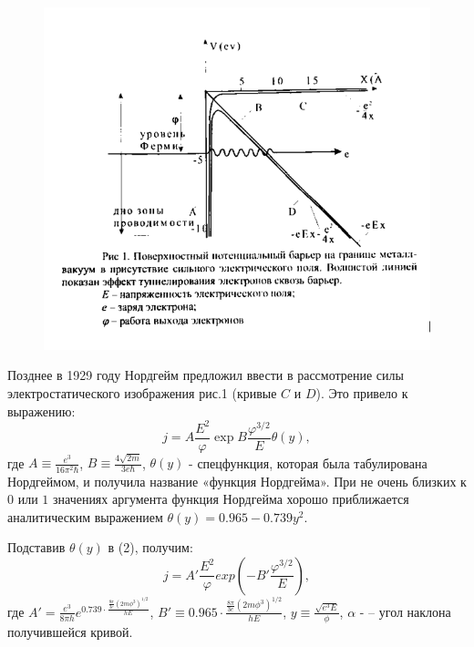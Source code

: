 \documentclass[12pt,a4paper]{article}
\begin{document}
\begin{figure}[h]
\centering
\includegraphics[width=12cm]{Pic1.png}
\end{figure}

Позднее в 1929 году Нордгейм предложил ввести в рассмотрение силы электростатического изображения рис.1 (кривые $C$ и $D$). Это привело к выражению:
\begin{equation}
    j = A\frac{E^2}{\varphi}\exp{B\frac{\varphi^{3/2}}{E}\theta(y)},
\end{equation}
где $A \equiv \frac{e^{3}}{16\pi^2\hbar}$, $B \equiv \frac{4\sqrt{2m}}{3e\hbar}$, $\theta(y)$ - спецфункция, которая была табулирована Нордгеймом, и получила название «функция Нордгейма». При не очень близких к $0$ или $1$ значениях аргумента функция Нордгейма хорошо приближается аналитическим выражением $\theta(y) = 0.965 - 0.739y^2$.

Подставив $\theta(y)$ в (2), получим:
\begin{equation}
    j = A'\frac{E^2}{\varphi}exp(-B'\frac{\varphi^{3/2}}{E}),
\end{equation}
где $A' = \frac{e^{3}}{8 \pi h}e^{0.739\cdot\frac{\frac{8\pi}{3e}(2m\phi^{3})^{1/2}}{hE}}$, $B' \equiv 0.965\cdot\frac{\frac{8\pi}{3e}(2m\phi^{3})^{1/2}}{hE}$, $y \equiv \frac{\sqrt{e^{3}E}}{\phi}$, $\alpha$ - – угол наклона получившейся кривой.
\end{document}
